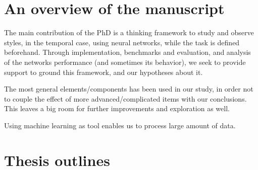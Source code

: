 \section{An overview of the manuscript}
\par The main contribution of the PhD is a thinking framework to study and observe styles, in the temporal case, using neural networks, while the task is defined beforehand. Through implementation, benchmarks and evaluation, and analysis of the networks performance (and sometimes its behavior), we seek to provide support to ground this framework, and our hypotheses about it.

\par The most general elements/components has been used in our study, in order not to couple the effect of more advanced/complicated items with our conclusions. This leaves a big room for further improvements and exploration as well.

\par Using machine learning as tool enables us to process large amount of data.

\section{Thesis outlines}

